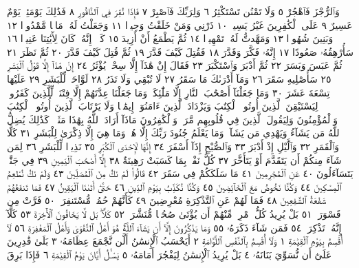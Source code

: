 وَٱلرُّجْزَ فَٱهْجُرْ ٥ وَلَا تَمْنُن تَسْتَكْثِرُ ٦ وَلِرَبِّكَ فَٱصْبِرْ ٧ فَإِذَا نُقِرَ
فِي ٱلنَّاقُورِ ٨ فَذَٰلِكَ يَوْمَئِذࣲ يَوْمٌ عَسِيرٌ ٩ عَلَى ٱلْكَٰفِرِينَ غَيْرُ يَسِيرࣲ ١٠
ذَرْنِي وَمَنْ خَلَقْتُ وَحِيدࣰا ١١ وَجَعَلْتُ لَهُۥ مَالࣰا مَّمْدُودࣰا ١٢ وَبَنِينَ
شُهُودࣰا ١٣ وَمَهَّدتُّ لَهُۥ تَمْهِيدࣰا ١٤ ثُمَّ يَطْمَعُ أَنْ أَزِيدَ ١٥ كَلَّآۖ إِنَّهُۥ
كَانَ لِأٓيَٰتِنَا عَنِيدࣰا ١٦ سَأُرْهِقُهُۥ صَعُودًا ١٧ إِنَّهُۥ فَكَّرَ وَقَدَّرَ ١٨
فَقُتِلَ كَيْفَ قَدَّرَ ١٩ ثُمَّ قُتِلَ كَيْفَ قَدَّرَ ٢٠ ثُمَّ نَظَرَ ٢١ ثُمَّ عَبَسَ وَبَسَرَ ٢٢
ثُمَّ أَدْبَرَ وَٱسْتَكْبَرَ ٢٣ فَقَالَ إِنْ هَٰذَآ إِلَّا سِحْرࣱ يُؤْثَرُ ٢٤ إِنْ هَٰذَآ
إِلَّا قَوْلُ ٱلْبَشَرِ ٢٥ سَأُصْلِيهِ سَقَرَ ٢٦ وَمَآ أَدْرَىٰكَ مَا سَقَرُ ٢٧
لَا تُبْقِي وَلَا تَذَرُ ٢٨ لَوَّاحَةࣱ لِّلْبَشَرِ ٢٩ عَلَيْهَا تِسْعَةَ عَشَرَ ٣٠ وَمَا جَعَلْنَآ
أَصْحَٰبَ ٱلنَّارِ إِلَّا مَلَٰٓئِكَةࣰۖ وَمَا جَعَلْنَا عِدَّتَهُمْ إِلَّا فِتْنَةࣰ لِّلَّذِينَ كَفَرُوا۟
لِيَسْتَيْقِنَ ٱلَّذِينَ أُوتُوا۟ ٱلْكِتَٰبَ وَيَزْدَادَ ٱلَّذِينَ ءَامَنُوٓا۟ إِيمَٰنࣰا وَلَا يَرْتَابَ
ٱلَّذِينَ أُوتُوا۟ ٱلْكِتَٰبَ وَٱلْمُؤْمِنُونَ وَلِيَقُولَ ٱلَّذِينَ فِي قُلُوبِهِم مَّرَضࣱ
وَٱلْكَٰفِرُونَ مَاذَآ أَرَادَ ٱللَّهُ بِهَٰذَا مَثَلࣰاۚ كَذَٰلِكَ يُضِلُّ ٱللَّهُ مَن يَشَآءُ
وَيَهْدِي مَن يَشَآءُۚ وَمَا يَعْلَمُ جُنُودَ رَبِّكَ إِلَّا هُوَۚ وَمَا هِيَ إِلَّا ذِكْرَىٰ
لِلْبَشَرِ ٣١ كَلَّا وَٱلْقَمَرِ ٣٢ وَٱلَّيْلِ إِذْ أَدْبَرَ ٣٣ وَٱلصُّبْحِ إِذَآ أَسْفَرَ ٣٤ إِنَّهَا
لَإِحْدَى ٱلْكُبَرِ ٣٥ نَذِيرࣰا لِّلْبَشَرِ ٣٦ لِمَن شَآءَ مِنكُمْ أَن يَتَقَدَّمَ أَوْ يَتَأَخَّرَ ٣٧
كُلُّ نَفْسِۭ بِمَا كَسَبَتْ رَهِينَةٌ ٣٨ إِلَّآ أَصْحَٰبَ ٱلْيَمِينِ ٣٩ فِي جَنَّٰتࣲ
يَتَسَآءَلُونَ ٤٠ عَنِ ٱلْمُجْرِمِينَ ٤١ مَا سَلَكَكُمْ فِي سَقَرَ ٤٢ قَالُوا۟ لَمْ نَكُ
مِنَ ٱلْمُصَلِّينَ ٤٣ وَلَمْ نَكُ نُطْعِمُ ٱلْمِسْكِينَ ٤٤ وَكُنَّا نَخُوضُ مَعَ
ٱلْخَآئِضِينَ ٤٥ وَكُنَّا نُكَذِّبُ بِيَوْمِ ٱلدِّينِ ٤٦ حَتَّىٰٓ أَتَىٰنَا ٱلْيَقِينُ ٤٧
فَمَا تَنفَعُهُمْ شَفَٰعَةُ ٱلشَّٰفِعِينَ ٤٨ فَمَا لَهُمْ عَنِ ٱلتَّذْكِرَةِ
مُعْرِضِينَ ٤٩ كَأَنَّهُمْ حُمُرࣱ مُّسْتَنفِرَةࣱ ٥٠ فَرَّتْ مِن قَسْوَرَةِۭ ٥١
بَلْ يُرِيدُ كُلُّ ٱمْرِئࣲ مِّنْهُمْ أَن يُؤْتَىٰ صُحُفࣰا مُّنَشَّرَةࣰ ٥٢ كَلَّاۖ بَل لَّا
يَخَافُونَ ٱلْأٓخِرَةَ ٥٣ كَلَّآ إِنَّهُۥ تَذْكِرَةࣱ ٥٤ فَمَن شَآءَ ذَكَرَهُۥ ٥٥ وَمَا
يَذْكُرُونَ إِلَّآ أَن يَشَآءَ ٱللَّهُۚ هُوَ أَهْلُ ٱلتَّقْوَىٰ وَأَهْلُ ٱلْمَغْفِرَةِ ٥٦
لَآ أُقْسِمُ بِيَوْمِ ٱلْقِيَٰمَةِ ١ وَلَآ أُقْسِمُ بِٱلنَّفْسِ ٱللَّوَّامَةِ ٢ أَيَحْسَبُ
ٱلْإِنسَٰنُ أَلَّن نَّجْمَعَ عِظَامَهُۥ ٣ بَلَىٰ قَٰدِرِينَ عَلَىٰٓ أَن نُّسَوِّيَ بَنَانَهُۥ ٤ بَلْ
يُرِيدُ ٱلْإِنسَٰنُ لِيَفْجُرَ أَمَامَهُۥ ٥ يَسْـَٔلُ أَيَّانَ يَوْمُ ٱلْقِيَٰمَةِ ٦ فَإِذَا بَرِقَ
